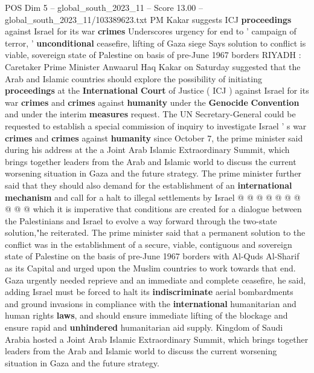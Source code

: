 \begin{textsample}{POS Dim 5 – global\_south\_2023\_11 – Score 13.00 – global\_south\_2023\_11/103389623.txt}  \label{ex:f5_pos_253}
PM Kakar suggests ICJ \textbf{proceedings} against Israel for its war \textbf{crimes} Underscores urgency for end to ' campaign of terror, ' \textbf{unconditional} ceasefire, lifting of Gaza siege Says solution to conflict is viable, sovereign state of Palestine on basis of pre-June 1967 borders RIYADH : Caretaker Prime Minister Anwaarul Haq Kakar on Saturday suggested that the Arab and Islamic countries should explore the possibility of initiating \textbf{proceedings} at the \textbf{International} \textbf{Court} of Justice ( ICJ ) against Israel for its war \textbf{crimes} and \textbf{crimes} against \textbf{humanity} under the \textbf{Genocide} \textbf{Convention} and under the interim \textbf{measures} request.
The UN Secretary-General could be requested to establish a special commission of inquiry to investigate Israel ' s war \textbf{crimes} and \textbf{crimes} against \textbf{humanity} since October 7, the prime minister said during his address at the a Joint Arab Islamic Extraordinary Summit, which brings together leaders from the Arab and Islamic world to discuss the current worsening situation in Gaza and the future strategy.
The prime minister further said that they should also demand for the establishment of an \textbf{international} \textbf{mechanism} and call for a halt to illegal settlements by Israel @ @ @ @ @ @ @ @ @ @ which it is imperative that conditions are created for a dialogue between the Palestinians and Israel to evolve a way forward through the two-state solution,"he reiterated.
The prime minister said that a permanent solution to the conflict was in the establishment of a secure, viable, contiguous and sovereign state of Palestine on the basis of pre-June 1967 borders with Al-Quds Al-Sharif as its Capital and urged upon the Muslim countries to work towards that end.
Gaza urgently needed reprieve and an immediate and complete ceasefire, he said, adding Israel must be forced to halt its \textbf{indiscriminate} aerial bombardments and ground invasions in compliance with the \textbf{international} humanitarian and human rights \textbf{laws}, and should ensure immediate lifting of the blockage and ensure rapid and \textbf{unhindered} humanitarian aid supply.
Kingdom of Saudi Arabia hosted a Joint Arab Islamic Extraordinary Summit, which brings together leaders from the Arab and Islamic world to discuss the current worsening situation in Gaza and the future strategy.

\end{textsample}
